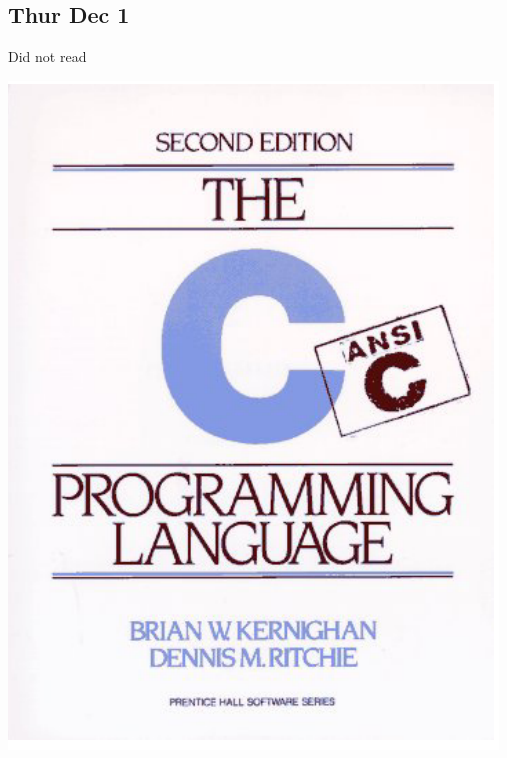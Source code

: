 \documentclass{article}
\begin{document}
\subsection{Thur Dec 1}

Did not read

\pagebreak{}
\includegraphics[width=\textwidth]{images/the-c-programming-language.png}
\end{document}

